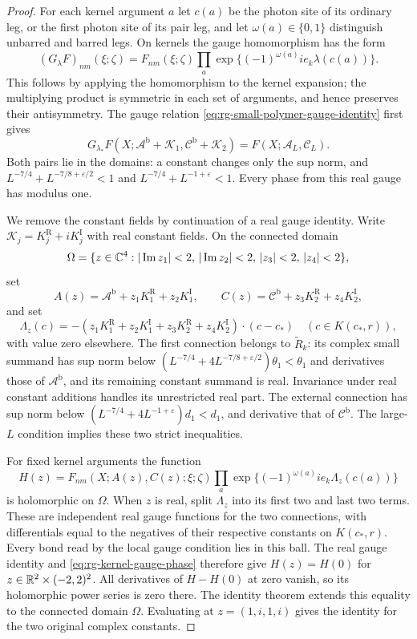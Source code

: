 \begin{proof}
For each kernel argument $a$ let $c(a)$ be the photon site
of its ordinary leg, or the first photon site of its pair
leg, and let $\omega(a)\in\{0,1\}$ distinguish unbarred and
barred legs. On kernels the gauge homomorphism has the
form
\begin{equation}\label{eq:rg-kernel-gauge-phase}
 (G_\lambda F)_{nm}(\xi;\zeta)
       =F_{nm}(\xi;\zeta)
          \prod_a\exp\{(-1)^{\omega(a)}ie_k\lambda(c(a))\}.
\end{equation}
This follows by applying the homomorphism to the kernel
expansion; the multiplying product is symmetric in each
set of arguments, and hence preserves their antisymmetry.
The gauge relation \eqref{eq:rg-small-polymer-gauge-identity}
first gives
\[
 G_{\lambda_*}F(X;\mathscr A^{\mathrm b}+\mathscr K_1,
                         \mathscr C^{\mathrm b}+\mathscr K_2)
                       =F(X;\mathscr A_L,\mathscr C_L).
\]
Both pairs lie in the domains: a constant changes only
the sup norm, and
$L^{-7/4}+L^{-7/8+\varepsilon/2}<1$ and
$L^{-7/4}+L^{-1+\varepsilon}<1$.
Every phase from this real gauge has modulus one.

We remove the constant fields by continuation of a real
gauge identity. Write $\mathscr K_j=K_j^{\mathrm R}+iK_j^{\mathrm I}$
with real constant fields. On the connected domain
\[
 \Omega=\{z\in\mathbb C^4:|\operatorname{Im}z_1|<2,\,
       |\operatorname{Im}z_2|<2,\,|z_3|<2,\,|z_4|<2\},
\]
set
\[
 A(z)=\mathscr A^{\mathrm b}+z_1K_1^{\mathrm R}+z_2K_1^{\mathrm I},
 \qquad
 C(z)=\mathscr C^{\mathrm b}+z_3K_2^{\mathrm R}+z_4K_2^{\mathrm I},
\]
and set
\[
 \Lambda_z(c)=-
       (z_1K_1^{\mathrm R}+z_2K_1^{\mathrm I}
                  +z_3K_2^{\mathrm R}+z_4K_2^{\mathrm I})\cdot(c-c_*)
                    \quad(c\in K(c_*,r)),
\]
with value zero elsewhere. The first connection belongs to
$\widetilde R_k$: its complex small summand has sup norm
below $(L^{-7/4}+4L^{-7/8+\varepsilon/2})\theta_1<\theta_1$
and derivatives those of $\mathscr A^{\mathrm b}$, and its
remaining constant summand is real. Invariance under real
constant additions handles its unrestricted real part.
The external connection has sup norm below
$(L^{-7/4}+4L^{-1+\varepsilon})d_1<d_1$, and derivative
that of $\mathscr C^{\mathrm b}$. The large-$L$ condition
implies these two strict inequalities.

For fixed kernel arguments the function
\[
 H(z)=F_{nm}(X;A(z),C(z);\xi;\zeta)
             \prod_a\exp\{(-1)^{\omega(a)}ie_k\Lambda_z(c(a))\}
\]
is holomorphic on $\Omega$. When $z$ is real, split
$\Lambda_z$ into its first two and last two terms.
These are independent real gauge functions for the two
connections, with differentials equal to the negatives
of their respective constants on $K(c_*,r)$. Every bond
read by the local gauge condition lies in this ball.
The real gauge identity and
\eqref{eq:rg-kernel-gauge-phase} therefore give
$H(z)=H(0)$ for $z\in\mathbb R^2\times(-2,2)^2$.
All derivatives of $H-H(0)$ at zero vanish, so its
holomorphic power series is zero there. The identity
theorem extends this equality to the connected domain
$\Omega$. Evaluating at $z=(1,i,1,i)$ gives the identity
for the two original complex constants.


\end{proof}
